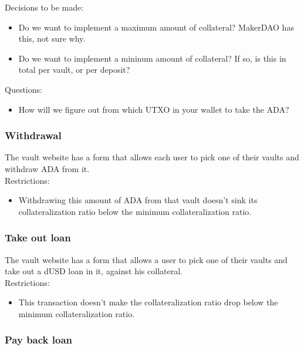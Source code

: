 \documentclass{article} %
\begin{document}
Decisions to be made:
\begin{itemize}
  \item Do we want to implement a maximum amount of collateral? MakerDAO has
    this, not sure why.
  \item Do we want to implement a mininum amount of collateral? If so, is this
    in total per vault, or per deposit?
\end{itemize}

Questions:
\begin{itemize}
  \item How will we figure out from which UTXO in your wallet to take the ADA?
\end{itemize}

\subsubsection{Withdrawal}

The vault website has a form that allows each user to pick one of their vaults
and withdraw ADA from it. \\

Restrictions:
\begin{itemize}
  \item Withdrawing this amount of ADA from that vault doesn't sink its
    collateralization ratio below the minimum collateralization ratio.
\end{itemize}

\subsubsection{Take out loan}

The vault website has a form that allows a user to pick one of their vaults and
take out a dUSD loan in it, against his collateral. \\

Restrictions:
\begin{itemize}
  \item This transaction doesn't make the collateralization ratio drop below the
    minimum collateralization ratio.
\end{itemize}


\subsubsection{Pay back loan}
\end{document}
